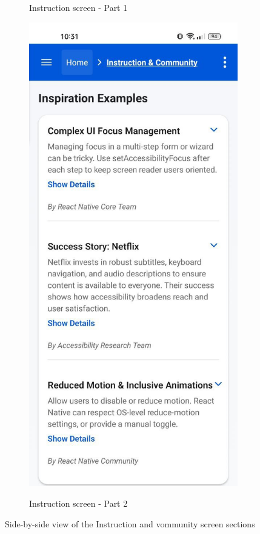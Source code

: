 \begin{figure}[ht]
\begin{subfigure}[b]{0.48\textwidth}
        \caption{Instruction screen - Part 1}
        \label{fig:instruction-left}
    \end{subfigure}
    \hfill
    \begin{subfigure}[b]{0.48\textwidth}
        \centering
        \includegraphics[width=\linewidth, alt={Second part of the Instruction and community screen}]{img/instruction2.jpg}
        \caption{Instruction screen - Part 2}
        \label{fig:instruction-right}
    \end{subfigure}
    \caption{Side-by-side view of the Instruction and vommunity screen sections}
    \label{fig:instruction_screens_sidebyside}
\end{figure}

